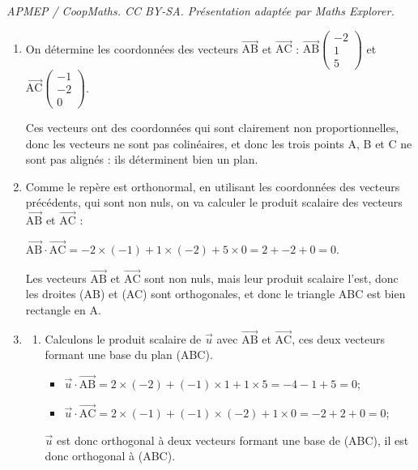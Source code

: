 \documentclass[10pt]{article}
\providecommand{\vect}[1]{\overrightarrow{#1}}
\begin{document}
\noindent\textit{APMEP / CoopMaths. CC BY-SA. Présentation adaptée par Maths Explorer.}\par\medskip
\begin{enumerate}
	\item On détermine les coordonnées des vecteurs $\vect{\mathrm{AB}}$ et $\vect{\mathrm{AC}}$ : \quad $\vect{\mathrm{AB}}\begin{pmatrix}-2\\1\\5 \end{pmatrix}$
	 et $\vect{\mathrm{AC}}\begin{pmatrix}-1\\-2\\0 \end{pmatrix}$.

	 Ces vecteurs ont des coordonnées qui sont clairement non proportionnelles, donc les vecteurs ne sont pas colinéaires, et donc les trois points A, B et C ne sont pas alignés : ils déterminent bien un plan.

	 \item Comme le repère est orthonormal, en utilisant les coordonnées des vecteurs précédents, qui sont non nuls, on va calculer le produit scalaire des vecteurs $\vect{\mathrm{AB}}$ et $\vect{\mathrm{AC}}$ :

$\vect{\mathrm{AB}}\cdot\vect{\mathrm{AC}} = -2 \times (-1) + 1  \times  (-2) + 5  \times 0 = 2 + -2 + 0 = 0$.

Les vecteurs $\vect{\mathrm{AB}}$ et $\vect{\mathrm{AC}}$ sont non nuls, mais leur produit scalaire l'est, donc les droites (AB) et (AC) sont orthogonales, et donc le triangle ABC est bien rectangle en A.

	\item 
		\begin{enumerate}
		\item Calculons le produit scalaire de $\vect{u}$ avec $\vect{\mathrm{AB}}$ et $\vect{\mathrm{AC}}$, ces deux vecteurs formant une base du plan (ABC).

\begin{itemize}
\item $\vect{u}\cdot \vect{\mathrm{AB}} = 2  \times (-2) + (-1) \times 1 + 1  \times 5 = -4 - 1 + 5 = 0$;
\item $\vect{u}\cdot \vect{\mathrm{AC}} = 2  \times (-1) + (-1) \times (-2) + 1  \times 0 = -2 + 2 + 0 = 0$;
\end{itemize}

 $\vect{u}$ est donc orthogonal à deux vecteurs formant une base de (ABC), il est donc orthogonal à (ABC).


\end{enumerate}
\end{enumerate}
\end{document}
